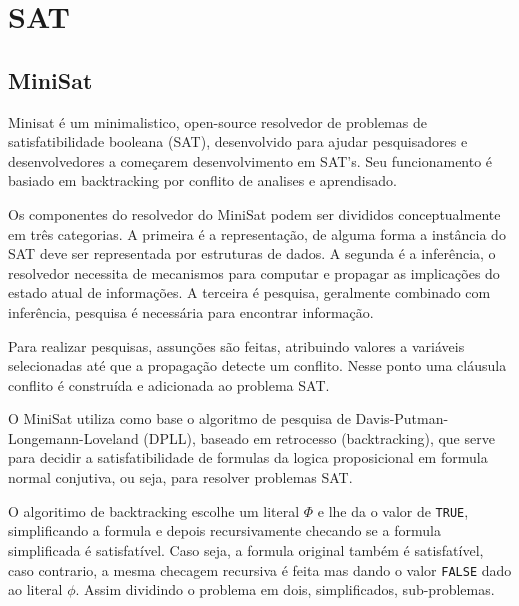 \section{SAT}
\label{sec:sat}

\subsection{MiniSat}
\label{sec:minisat}

Minisat é um minimalistico, open-source resolvedor de problemas de satisfatibilidade booleana (SAT), desenvolvido para 
ajudar pesquisadores e desenvolvedores a começarem desenvolvimento em SAT's. Seu funcionamento é basiado em backtracking
por conflito de analises e aprendisado.

Os componentes do resolvedor do MiniSat podem ser divididos conceptualmente em três categorias. A primeira é a representação,
de alguma forma a instância do SAT deve ser representada por estruturas de dados. A segunda é a inferência, o resolvedor necessita
de mecanismos para computar e propagar as implicações do estado atual de informações. A terceira é pesquisa, geralmente combinado
com inferência, pesquisa é necessária para encontrar informação.

Para realizar pesquisas, assunções são feitas, atribuindo valores a variáveis selecionadas até que a propagação detecte um conflito.
Nesse ponto uma cláusula conflito é construída e adicionada ao problema SAT.

O MiniSat utiliza como base o algoritmo de pesquisa de Davis-Putman-Longemann-Loveland (DPLL), baseado em 
retrocesso (backtracking), que serve para decidir a satisfatibilidade de formulas da logica proposicional em formula normal
conjutiva, ou seja, para resolver problemas SAT.

O algoritimo de backtracking escolhe um literal $\Phi$ e lhe da o valor de \texttt{TRUE}, simplificando a formula e depois
recursivamente checando se a formula simplificada é satisfatível. Caso seja, a formula original também é
satisfatível, caso contrario, a mesma checagem recursiva é feita mas dando o valor \texttt{FALSE} dado ao literal $\phi$.
Assim dividindo o problema em dois, simplificados, sub-problemas.

